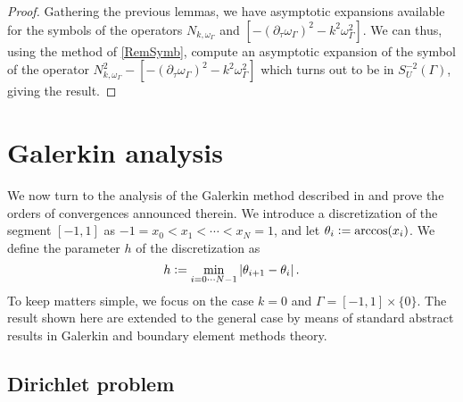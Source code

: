 \documentclass[a4paper]{article}
\begin{document}
\begin{proof}
	Gathering the previous lemmas, we have asymptotic expansions available for the symbols of the operators $N_{k,\omega_\Gamma}$ and $\left[-(\partial_\tau \omega_\Gamma )^2 - k^2\omega_\Gamma^2\right]$. We can thus, using the method of \autoref{RemSymb}, compute an asymptotic expansion of the symbol of the operator $N_{k,\omega_\Gamma}^2 - \left[-(\partial_\tau \omega_\Gamma )^2 - k^2\omega_\Gamma^2\right]$
	which turns out to be in $S^{-2}_U(\Gamma)$, giving the result. 
\end{proof}


\section{Galerkin analysis}

\label{subsec:GalerkineSetting}

We now turn to the analysis of the Galerkin method described in \cite{alouges2018new} and prove the orders of convergences announced therein. We introduce a discretization of the segment $[-1,1]$ as $-1 = x_0 < x_1 < \cdots < x_N = 1$, and let $\theta_i \mathrel{\mathop:}= \arccos(x_i)$. We define the parameter $h$ of the discretization as 
\[ h \mathrel{\mathop:}= \min_{i=0\cdots N-1} \left\lvert \theta_{i+1} - \theta_{i} \right\rvert.\]
To keep matters simple, we focus on the case $k = 0$ and $\Gamma = [-1,1]\times \{0\}$. The result shown here are extended to the general case by means of standard abstract results in Galerkin and boundary element methods theory. 

\subsection{Dirichlet problem}
\end{document}
